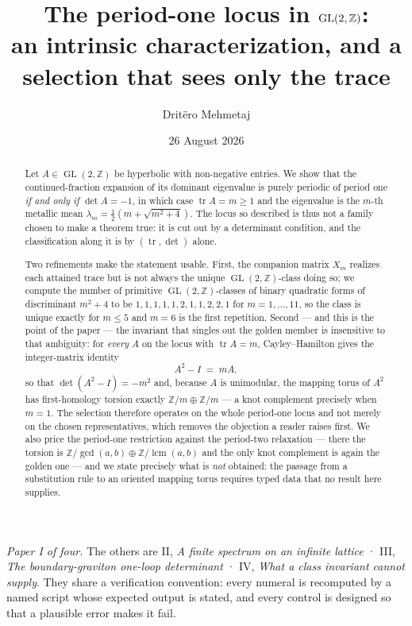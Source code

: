 \documentclass[11pt,a4paper]{article}
\title{The period-one locus in $\GL(2,\Z)$:\\
an intrinsic characterization, and a selection that sees only the trace}
\author{Drit\"ero Mehmetaj}
\date{26 August 2026}
\theoremstyle{definition}
\theoremstyle{remark}
\newcommand{\GL}{\operatorname{GL}}
\newcommand{\Z}{\mathbb{Z}}
\newcommand{\tr}{\operatorname{tr}}
\newcommand{\lcm}{\operatorname{lcm}}
\begin{document}
\maketitle

\begin{abstract}
Let $A\in\GL(2,\Z)$ be hyperbolic with non-negative entries. We show that the
continued-fraction expansion of its dominant eigenvalue is purely periodic of period one
\emph{if and only if} $\det A=-1$, in which case $\tr A=m\ge1$ and the eigenvalue is the
$m$-th metallic mean $\lambda_m=\tfrac12(m+\sqrt{m^2+4})$. The locus so described is thus
not a family chosen to make a theorem true: it is cut out by a determinant condition, and
the classification along it is by $(\tr,\det)$ alone.

Two refinements make the statement usable. First, the companion matrix $X_m$ realizes each
attained trace but is not always the unique $\GL(2,\Z)$-class doing so; we compute the
number of primitive $\GL(2,\Z)$-classes of binary quadratic forms of discriminant $m^2+4$
to be $1,1,1,1,1,2,1,1,2,2,1$ for $m=1,\dots,11$, so the class is unique exactly for
$m\le5$ and $m=6$ is the first repetition. Second --- and this is the point of the paper
--- the invariant that singles out the golden member is insensitive to that ambiguity: for
\emph{every} $A$ on the locus with $\tr A=m$, Cayley--Hamilton gives the integer-matrix
identity
\[
   A^2-I\;=\;mA ,
\]
so that $\det(A^2-I)=-m^2$ and, because $A$ is unimodular, the mapping torus of $A^2$ has
first-homology torsion exactly $\Z/m\oplus\Z/m$ --- a knot complement precisely when $m=1$. The selection therefore operates on the whole
period-one locus and not merely on the chosen representatives, which removes the objection a
reader raises first. We also price the period-one restriction against the period-two
relaxation --- there the torsion is $\Z/\gcd(a,b)\oplus\Z/\lcm(a,b)$ and the only knot
complement is again the golden one --- and we state precisely what is \emph{not} obtained:
the passage from a substitution rule to an oriented mapping torus requires typed data that
no result here supplies.
\end{abstract}

\begin{center}\small
\textit{Paper I of four.} The others are II, \emph{A finite spectrum on an infinite lattice} · III, \emph{The boundary-graviton one-loop determinant} · IV, \emph{What a class invariant cannot supply}.
They share a verification convention: every numeral is recomputed by a named script whose
expected output is stated, and every control is designed so that a plausible error makes it fail.
\end{center}
\end{document}
